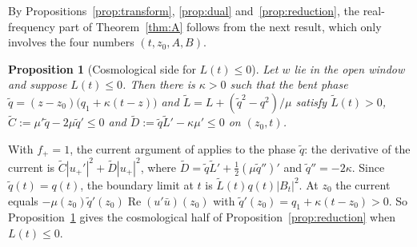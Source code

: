\documentclass[11pt]{amsart}
\newtheorem{proposition}[theorem]{Proposition}
\theoremstyle{definition}
\theoremstyle{remark}
\numberwithin{equation}{section}
\renewcommand{\Re}{\operatorname{Re}}
\begin{document}
By Propositions~\ref{prop:transform}, \ref{prop:dual} and~\ref{prop:reduction}, the real-frequency part of
Theorem~\ref{thm:A} follows from the next result, which only involves the four numbers $(t,z_0,A,B)$.

\begin{proposition}[Cosmological side for $L(t)\le0$]\label{hyp:cos}
Let $w$ lie in the open window and suppose $L(t)\le0$. Then there is $\kappa>0$ such that the bent phase
$\tilde q=(z-z_0)\big(q_1+\kappa(t-z)\big)$ and $\tilde L=L+(\tilde q^2-q^2)/\mu$ satisfy $\tilde L(t)>0$,
$\tilde C:=\mu'\tilde q-2\mu\tilde q'\le0$ and $\tilde D:=\tilde q\tilde L'-\kappa\mu'\le0$ on $(z_0,t)$.
\end{proposition}

With $f_+=1$, the current argument of \cite[Lemma~4.1, \S7]{Hin26} applies to the phase $\tilde q$: the
derivative of the current is $\tilde C|u_+'|^2+\tilde D|u_+|^2$, where $\tilde D=\tilde q\tilde L'+\frac12(\mu\tilde q'')'$
and $\tilde q''=-2\kappa$. Since $\tilde q(t)=q(t)$, the boundary limit at $t$ is $\tilde L(t)q(t)|B_t|^2$. At $z_0$ the
current equals $-\mu(z_0)\tilde q'(z_0)\Re(u'\bar u)(z_0)$ with $\tilde q'(z_0)=q_1+\kappa(t-z_0)>0$. So
Proposition~\ref{hyp:cos} gives the cosmological half of Proposition~\ref{prop:reduction} when $L(t)\le0$.
\end{document}
